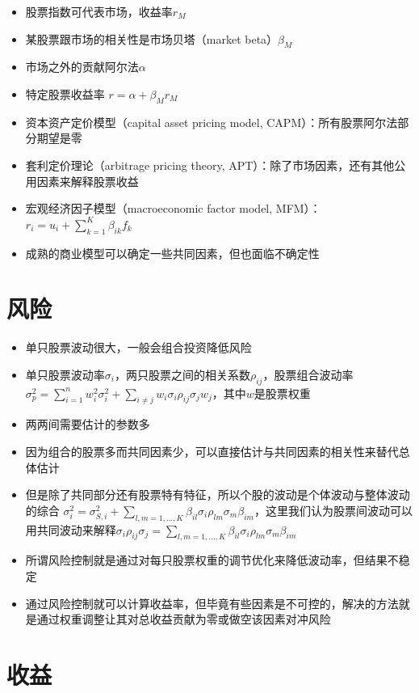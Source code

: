 \documentclass[]{book}
\providecommand{\tightlist}{%
  \setlength{\itemsep}{0pt}\setlength{\parskip}{0pt}}
\begin{document}
\begin{itemize}
\tightlist
\item
  股票指数可代表市场，收益率\(r_M\)
\item
  某股票跟市场的相关性是市场贝塔（market beta）\(\beta_M\)
\item
  市场之外的贡献阿尔法\(\alpha\)
\item
  特定股票收益率 \(r = \alpha + \beta_M r_M\)
\item
  资本资产定价模型（capital asset pricing model, CAPM）：所有股票阿尔法部分期望是零
\item
  套利定价理论（arbitrage pricing theory, APT）：除了市场因素，还有其他公用因素来解释股票收益
\item
  宏观经济因子模型（macroeconomic factor model, MFM）：\(r_i = u_i+\sum_{k=1}^{K}\beta_{ik}f_k\)
\item
  成熟的商业模型可以确定一些共同因素，但也面临不确定性
\end{itemize}

\section{风险}

\begin{itemize}
\tightlist
\item
  单只股票波动很大，一般会组合投资降低风险
\item
  单只股票波动率\(\sigma_i\)，两只股票之间的相关系数\(\rho_{ij}\)，股票组合波动率\(\sigma_p^2 = \sum_{i=1}^nw_i^2\sigma_i^2 + \sum_{i\neq j}w_i\sigma_i\rho_{ij}\sigma_jw_j\)，其中\(w\)是股票权重
\item
  两两间需要估计的参数多
\item
  因为组合的股票多而共同因素少，可以直接估计与共同因素的相关性来替代总体估计
\item
  但是除了共同部分还有股票特有特征，所以个股的波动是个体波动与整体波动的综合 \(\sigma_i^2 = \sigma_{S,i}^2 + \sum_{l,m = 1,...,K}\beta_{il}\sigma_i\rho_{lm}\sigma_m\beta_{im}\)，这里我们认为股票间波动可以用共同波动来解释\(\sigma_i\rho_{ij}\sigma_j = \sum_{l,m = 1,...,K}\beta_{il}\sigma_i\rho_{lm}\sigma_m\beta_{im}\)
\item
  所谓风险控制就是通过对每只股票权重的调节优化来降低波动率，但结果不稳定
\item
  通过风险控制就可以计算收益率，但毕竟有些因素是不可控的，解决的方法就是通过权重调整让其对总收益贡献为零或做空该因素对冲风险
\end{itemize}

\section{收益}
\end{document}
